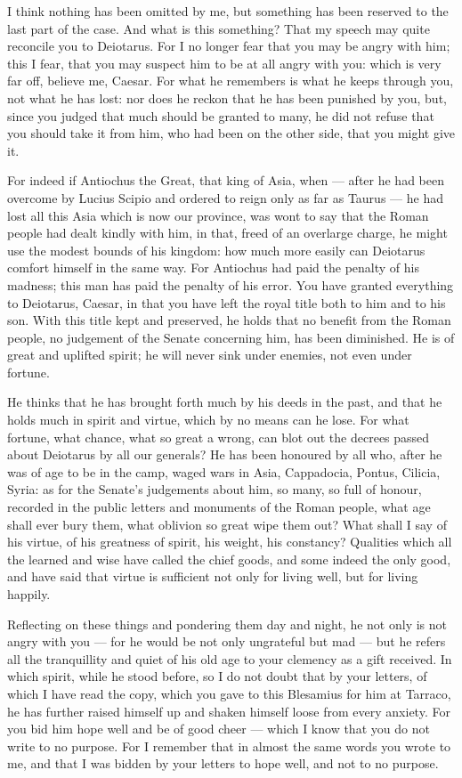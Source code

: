  I think nothing has been omitted by me, but something has been reserved to the last part of the case. And what is this something? That my speech may quite reconcile you to Deiotarus. For I no longer fear that you may be angry with him; this I fear, that you may suspect him to be at all angry with you: which is very far off, believe me, Caesar. For what he remembers is what he keeps through you, not what he has lost: nor does he reckon that he has been punished by you, but, since you judged that much should be granted to many, he did not refuse that you should take it from him, who had been on the other side, that you might give it.

 For indeed if Antiochus the Great, that king of Asia, when --- after he had been overcome by Lucius Scipio and ordered to reign only as far as Taurus --- he had lost all this Asia which is now our province, was wont to say that the Roman people had dealt kindly with him, in that, freed of an overlarge charge, he might use the modest bounds of his kingdom: how much more easily can Deiotarus comfort himself in the same way. For Antiochus had paid the penalty of his madness; this man has paid the penalty of his error. You have granted everything to Deiotarus, Caesar, in that you have left the royal title both to him and to his son. With this title kept and preserved, he holds that no benefit from the Roman people, no judgement of the Senate concerning him, has been diminished. He is of great and uplifted spirit; he will never sink under enemies, not even under fortune.

 He thinks that he has brought forth much by his deeds in the past, and that he holds much in spirit and virtue, which by no means can he lose. For what fortune, what chance, what so great a wrong, can blot out the decrees passed about Deiotarus by all our generals? He has been honoured by all who, after he was of age to be in the camp, waged wars in Asia, Cappadocia, Pontus, Cilicia, Syria: as for the Senate's judgements about him, so many, so full of honour, recorded in the public letters and monuments of the Roman people, what age shall ever bury them, what oblivion so great wipe them out? What shall I say of his virtue, of his greatness of spirit, his weight, his constancy? Qualities which all the learned and wise have called the chief goods, and some indeed the only good, and have said that virtue is sufficient not only for living well, but for living happily.

 Reflecting on these things and pondering them day and night, he not only is not angry with you --- for he would be not only ungrateful but mad --- but he refers all the tranquillity and quiet of his old age to your clemency as a gift received. In which spirit, while he stood before, so I do not doubt that by your letters, of which I have read the copy, which you gave to this Blesamius for him at Tarraco, he has further raised himself up and shaken himself loose from every anxiety. For you bid him hope well and be of good cheer --- which I know that you do not write to no purpose. For I remember that in almost the same words you wrote to me, and that I was bidden by your letters to hope well, and not to no purpose.

